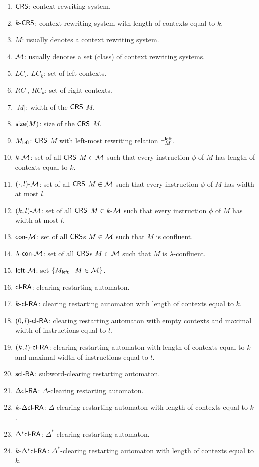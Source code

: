 \begin{enumerate}[]
\item $\textup{\sf CRS\/}$: context rewriting system.
\item $\textup{\sf $k$-\textup{\sf CRS\/}}$: context rewriting system with length of contexts equal to $k$.
\item $M$: usually denotes a context rewriting system.
\item $\textup{\sf $\mathcal{M}$}$: usually denotes a set (class) of context rewriting systems.
\item $LC_{\cdot}$, $LC_k$: set of left contexts.
\item $RC_{\cdot}$, $RC_k$: set of right contexts.
\item $|M|$: width of the $\textup{\sf CRS\/}$ $M$.
\item $\textup{\sf size}(M)$: size of the $\textup{\sf CRS\/}$ $M$.
\item $M_{\sf left}$: $\textup{\sf CRS\/}$ $M$ with left-most rewriting relation $\vdash^{\sf left}_M$.
\item $\textup{\sf $k$-\textup{\sf $\mathcal{M}$}}$: set of all $\textup{\sf CRS\/}$ $M \in \textup{\sf $\mathcal{M}$}$ such that every instruction $\phi$ of $M$ has length of contexts equal to $k$.
\item $\textup{\sf $(\cdot,l)$-\textup{\sf $\mathcal{M}$}}$: set of all $\textup{\sf CRS\/}$ $M \in \textup{\sf $\mathcal{M}$}$ such that every instruction $\phi$ of $M$ has width at most $l$.
\item $\textup{\sf $(k,l)$-\textup{\sf $\mathcal{M}$}}$: set of all $\textup{\sf CRS\/}$ $M \in \textup{\sf $k$-\textup{\sf $\mathcal{M}$}}$ such that every instruction $\phi$ of $M$ has width at most $l$.
\item $\textup{\sf con-\textup{\sf $\mathcal{M}$}}$: set of all $\textup{\sf CRS\/}$s $M \in \textup{\sf $\mathcal{M}$}$ such that $M$ is confluent.
\item $\textup{\sf $\lambda$-con-\textup{\sf $\mathcal{M}$}}$: set of all $\textup{\sf CRS\/}$s $M \in \textup{\sf $\mathcal{M}$}$ such that $M$ is $\lambda$-confluent.
\item $\textup{\sf left-\textup{\sf $\mathcal{M}$}}$: set $\{M_{\sf left} \mid M \in \textup{\sf $\mathcal{M}$}\}$.
\item $\textup{\sf cl-RA\/}$: clearing restarting automaton.
\item $\textup{\sf $k$-\textup{\sf cl-RA\/}}$: clearing restarting automaton with length of contexts equal to $k$.
\item $\textup{\sf $(0,l)$-\textup{\sf cl-RA\/}}$: clearing restarting automaton with empty contexts and maximal width of instructions equal to $l$.
\item $\textup{\sf $(k,l)$-\textup{\sf cl-RA\/}}$: clearing restarting automaton with length of contexts equal to $k$ and maximal width of instructions equal to $l$.
\item $\textup{\sf scl-RA}$: subword-clearing restarting automaton.
\item $\textup{\sf $\Delta$cl-RA\/}$: $\Delta$-clearing restarting automaton.
\item $\textup{\sf $k$-\textup{\sf $\Delta$cl-RA\/}}$: $\Delta$-clearing restarting automaton with length of contexts equal to $k$.
\item $\textup{\sf $\Delta^*$cl-RA\/}$: $\Delta^*$-clearing restarting automaton.
\item $\textup{\sf $k$-\textup{\sf $\Delta^*$cl-RA\/}}$: $\Delta^*$-clearing restarting automaton with length of contexts equal to $k$. 
\end{enumerate}

